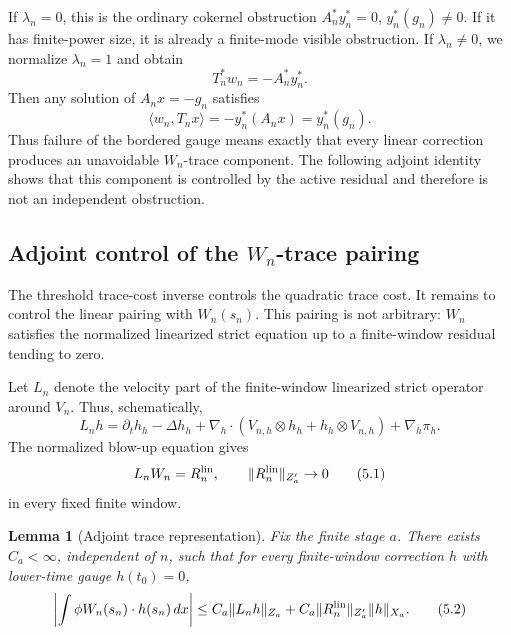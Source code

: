 \documentclass[11pt]{article}
\numberwithin{equation}{section}
\theoremstyle{plain}
\newtheorem{lemma}{Lemma}[section]
\theoremstyle{definition}
\theoremstyle{remark}
\newcommand{\dx}{\,dx}
\newcommand{\nabh}{\nabla_h}
\begin{document}
If \(\lambda_n=0\), this is the ordinary cokernel obstruction \(A_n^*y_n^*=0\), \(y_n^*(g_n)\ne0\).  If it has finite-power size, it is already a finite-mode visible obstruction.  If \(\lambda_n\ne0\), we normalize \(\lambda_n=1\) and obtain
\[
        T_n^*w_n=-A_n^*y_n^*.
\]
Then any solution of \(A_nx=-g_n\) satisfies
\[
        \langle w_n,T_nx\rangle
        =-y_n^*(A_nx)
        =y_n^*(g_n).
\]
Thus failure of the bordered gauge means exactly that every linear correction produces an unavoidable \(W_n\)-trace component.  The following adjoint identity shows that this component is controlled by the active residual and therefore is not an independent obstruction.

\subsection{Adjoint control of the \texorpdfstring{\(W_n\)}{Wn}-trace pairing}

The threshold trace-cost inverse controls the quadratic trace cost.  It remains to control the linear pairing with \(W_n(s_n)\).  This pairing is not arbitrary: \(W_n\) satisfies the normalized linearized strict equation up to a finite-window residual tending to zero.

Let \(L_n\) denote the velocity part of the finite-window linearized strict operator around \(V_n\).  Thus, schematically,
\[
        L_n h
        =
        \partial_t h_h-\Delta h_h
        +\nabh\cdot(V_{n,h}\otimes h_h+h_h\otimes V_{n,h})
        +\nabh \pi_h.
\]
The normalized blow-up equation gives
\[
        L_n W_n=R_n^{\rm lin},
        \qquad
        \|R_n^{\rm lin}\|_{Z_a'}\to0
        \tag{5.1}
\]
in every fixed finite window.

\begin{lemma}[Adjoint trace representation]
\label{pV:lem:adjoint-trace-representation}
Fix the finite stage \(a\).  There exists \(C_a<\infty\), independent of \(n\), such that for every finite-window correction \(h\) with lower-time gauge \(h(t_0)=0\),
\[
        \left|
        \int \phi W_n(s_n)\cdot h(s_n)\dx
        \right|
        \le
        C_a\|L_nh\|_{Z_a}
        +
        C_a\|R_n^{\rm lin}\|_{Z_a'}\|h\|_{X_a}.
        \tag{5.2}
\]
\end{lemma}
\end{document}
